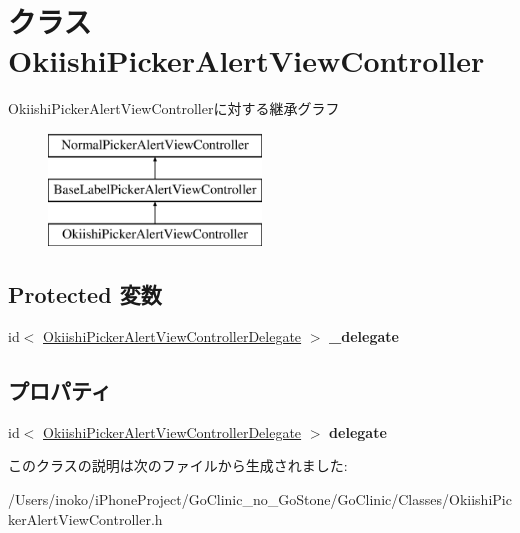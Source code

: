 \hypertarget{interface_okiishi_picker_alert_view_controller}{
\section{クラス OkiishiPickerAlertViewController}
\label{interface_okiishi_picker_alert_view_controller}
}
OkiishiPickerAlertViewControllerに対する継承グラフ\begin{figure}[H]
\begin{center}
\leavevmode
\includegraphics[height=3.000000cm]{interface_okiishi_picker_alert_view_controller}
\end{center}
\end{figure}
\subsection*{Protected 変数}
\begin{DoxyCompactItemize}
\item 
\hypertarget{interface_okiishi_picker_alert_view_controller_abc9889b054ca73244140a6b22563b4a1}{
id$<$ \hyperlink{protocol_okiishi_picker_alert_view_controller_delegate-p}{OkiishiPickerAlertViewControllerDelegate} $>$ {\bfseries \_\-delegate}}
\label{interface_okiishi_picker_alert_view_controller_abc9889b054ca73244140a6b22563b4a1}

\end{DoxyCompactItemize}
\subsection*{プロパティ}
\begin{DoxyCompactItemize}
\item 
\hypertarget{interface_okiishi_picker_alert_view_controller_a14d04a657ef22eac66c25f7ce4bb2ce4}{
id$<$ \hyperlink{protocol_okiishi_picker_alert_view_controller_delegate-p}{OkiishiPickerAlertViewControllerDelegate} $>$ {\bfseries delegate}}
\label{interface_okiishi_picker_alert_view_controller_a14d04a657ef22eac66c25f7ce4bb2ce4}

\end{DoxyCompactItemize}


このクラスの説明は次のファイルから生成されました:\begin{DoxyCompactItemize}
\item 
/Users/inoko/iPhoneProject/GoClinic\_\-no\_\-GoStone/GoClinic/Classes/OkiishiPickerAlertViewController.h\end{DoxyCompactItemize}

